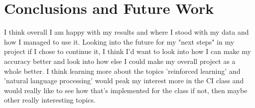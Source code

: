 \documentclass[paper=a4, fontsize=11pt,twoside]{scrartcl}
\begin{document}
\section{Conclusions and Future Work}


I think overall I am happy with my results and where I stood with my data and how I managed to use it. Looking into the future for my "next steps" in my project if I chose to continue it, I think I'd want to look into how I can make my accuracy better and look into how else I could make my overall project as a whole better. I think learning more about the topics 'reinforced learning' and 'natural language processing' would peak my interest more in the CI class and would really like to see how that's implemented for the class if not, then maybe other really interesting topics. \\

\newpage
\LARGE 
\end{document}
